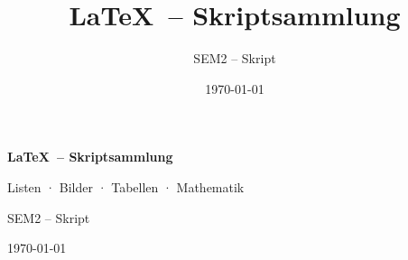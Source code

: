 \documentclass[12pt,a4paper]{report}
\title{\LaTeX\ -- Skriptsammlung}
\author{SEM2 -- Skript}
\date{\today}
\begin{document}
\begin{titlepage}
    \centering
    \vspace*{3cm}
    {\Huge\bfseries \LaTeX\ -- Skriptsammlung\par}
    \vspace{1cm}
    {\Large Listen · Bilder · Tabellen · Mathematik\par}
    \vspace{2cm}
    {\large SEM2 -- Skript\par}
    \vfill
    {\large\today\par}
\end{titlepage}

\tableofcontents
\newpage






\appendix


\printbibliography[heading=bibintoc]

\printindex
\end{document}
